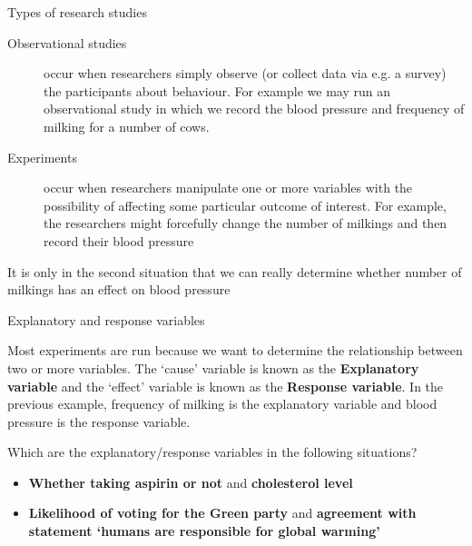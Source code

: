 \documentclass[12pt,xcolor=dvipsnames,handout,mathserif,aspectratio=169]{beamer}
\newcommand{\bbl}[1]{{\color{NavyBlue} \textbf{#1}}}
\newcommand{\bgr}[1]{{\color{PineGreen} \textbf{#1}}}
\begin{document}
\begin{frame}{Types of research studies}

\begin{description}
\item[Observational studies] occur when researchers simply observe (or collect data via e.g. a survey) the participants about behaviour. For example we may run an observational study in which we record the blood pressure and frequency of milking for a number of cows.
\pause
\item[Experiments] occur when researchers manipulate one or more variables with the possibility of affecting some particular outcome of interest. For example, the researchers might forcefully change the number of milkings and then record their blood pressure
\end{description}
\pause
It is only in the second situation that we can really determine whether number of milkings has an effect on blood pressure
\end{frame}

\begin{frame}{Explanatory and response variables }

Most experiments are run because we want to determine the relationship between two or more variables. The `cause' variable is known as the \bbl{Explanatory variable} and the `effect' variable is known as the \bgr{Response variable}. In the previous example, frequency of milking is the explanatory variable and blood pressure is the response variable. 

\begin{block}{}
Which are the explanatory/response variables in the following situations?
\begin{itemize}
\pause
\item \bgr{Whether taking aspirin or not} and \bbl{cholesterol level}
\pause
\pause
\item \bgr{Likelihood of voting for the Green party} and \bbl{agreement with statement `humans are responsible for global warming'}
\end{itemize}
\end{block}

\end{frame}
\end{document}
